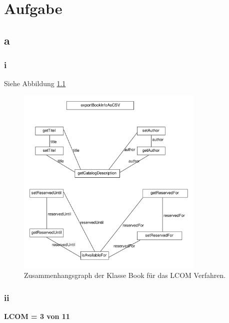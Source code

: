 \chapter{Aufgabe}
\section*{a}
\subsection*{i}
Siehe Abbildung \ref{fig:graphLCOM}

\begin{figure}[h!]
	\centering
	\includegraphics[width=0.8\textwidth, clip]{images/graphLCOM.pdf}
	\caption{Zusammenhangsgraph der Klasse Book für das  LCOM Verfahren. }
	\label{fig:graphLCOM}
\end{figure}
\subsection*{ii}
\textbf{LCOM = 3 von 11}



